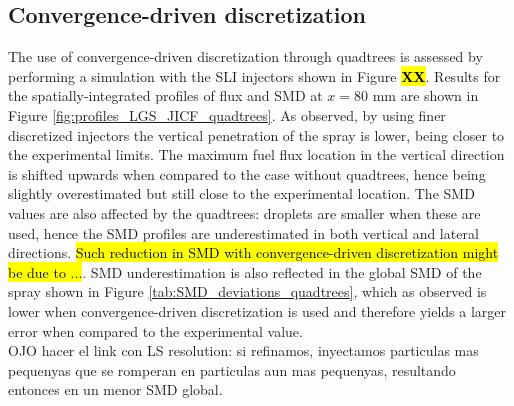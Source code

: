 \clearpage

\subsection{Convergence-driven discretization}

The use of convergence-driven discretization through quadtrees is assessed by performing a simulation with the SLI injectors shown in Figure \hl{\textbf{XX}}. Results for the spatially-integrated profiles of flux and SMD at $x = 80$ mm  are shown in Figure \ref{fig:profiles_LGS_JICF_quadtrees}. As observed, by using finer discretized injectors the vertical penetration of the spray is lower, being closer to the experimental limits. The maximum fuel flux location in the vertical direction is  shifted upwards when compared to the case without quadtrees, hence being slightly overestimated but still close to the experimental location. The SMD values are also affected by the quadtrees: droplets are smaller when these are used, hence the SMD profiles are underestimated in both vertical and lateral directions. \hl{Such reduction in SMD with convergence-driven discretization might be due to ...}. SMD underestimation is also reflected in the global SMD of the spray shown in Figure \ref{tab:SMD_deviations_quadtrees}, which as observed is lower when convergence-driven discretization is used and therefore yields a larger error when compared to the experimental value. \\

OJO hacer el link con LS resolution: si refinamos, inyectamos particulas mas pequenyas que se romperan en particulas aun mas pequenyas, resultando entonces en un menor SMD global. 



